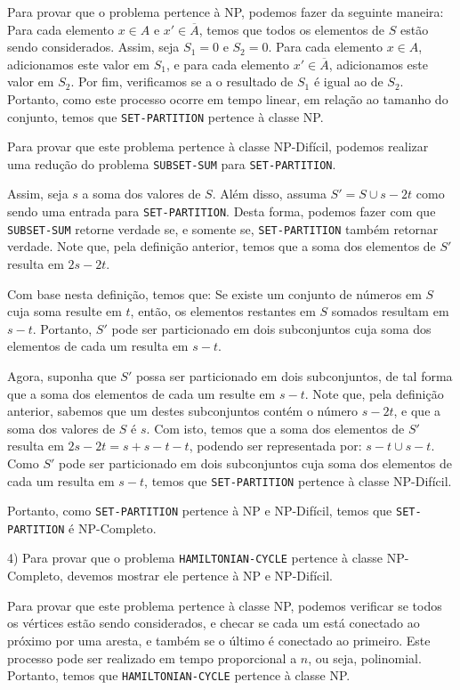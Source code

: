 \documentclass[]{article}
\begin{document}
Para provar que o problema pertence à NP, podemos fazer da seguinte maneira: Para cada elemento $x \in A$ e $x' \in \overline{A}$, temos que todos os elementos de $S$ estão sendo considerados. Assim, seja $S_1=0$ e $S_2=0$. Para cada elemento $x \in A$, adicionamos este valor em $S_1$, e para cada elemento $x' \in \overline{A}$, adicionamos este valor em $S_2$. Por fim, verificamos se a o resultado de $S_1$ é igual ao de $S_2$. Portanto, como este processo ocorre em tempo linear, em relação ao tamanho do conjunto, temos que \texttt{SET-PARTITION} pertence à classe NP.

Para provar que este problema pertence à classe NP-Difícil, podemos realizar uma redução do problema \texttt{SUBSET-SUM} para \texttt{SET-PARTITION}. 

Assim, seja $s$ a soma dos valores de $S$. Além disso, assuma $S' = S \cup {s - 2t}$ como sendo uma entrada para \texttt{SET-PARTITION}. Desta forma, podemos fazer com que \texttt{SUBSET-SUM} retorne verdade se, e somente se, \texttt{SET-PARTITION} também retornar verdade. Note que, pela definição anterior, temos que a soma dos elementos de $S'$ resulta em $2s - 2t$. 

Com base nesta definição, temos que: Se existe um conjunto de números em $S$ cuja soma resulte em $t$, então, os elementos restantes em $S$ somados resultam em $s - t$. Portanto, $S'$ pode ser particionado em dois subconjuntos cuja soma dos elementos de cada um resulta em $s - t$. 

Agora, suponha que $S'$ possa ser particionado em dois subconjuntos, de tal forma que a soma dos elementos de cada um resulte em $s - t$. Note que, pela definição anterior, sabemos que um destes subconjuntos contém o número $s - 2t$, e que a soma dos valores de $S$ é $s$. Com isto, temos que a soma dos elementos de $S'$ resulta em $2s - 2t = s + s - t - t$, podendo ser representada por: $s - t \cup s - t$. Como $S'$ pode ser particionado em dois subconjuntos cuja soma dos elementos de cada um resulta em $s - t$, temos que \texttt{SET-PARTITION} pertence à classe NP-Difícil.

Portanto, como \texttt{SET-PARTITION} pertence à NP e NP-Difícil, temos que \texttt{SET-PARTITION} é NP-Completo.

\newpage

4) Para provar que o problema \texttt{HAMILTONIAN-CYCLE} pertence à classe NP-Completo, devemos mostrar ele pertence à NP e NP-Difícil.

Para provar que este problema pertence à classe NP, podemos verificar se todos os vértices estão sendo considerados, e checar se cada um está conectado ao próximo por uma aresta, e também se o último é conectado ao primeiro. Este processo pode ser realizado em tempo proporcional a $n$, ou seja, polinomial. Portanto, temos que \texttt{HAMILTONIAN-CYCLE} pertence à classe NP.
\end{document}
